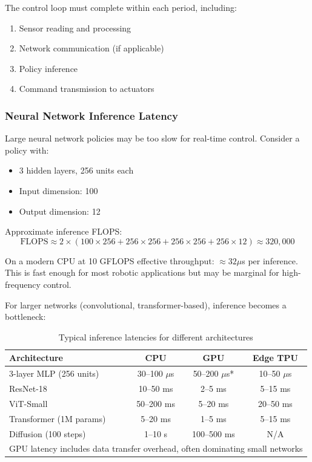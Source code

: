 The control loop must complete within each period, including:
\begin{enumerate}
    \item Sensor reading and processing
    \item Network communication (if applicable)
    \item Policy inference
    \item Command transmission to actuators
\end{enumerate}

\subsubsection{Neural Network Inference Latency}

Large neural network policies may be too slow for real-time control. Consider a policy with:
\begin{itemize}
    \item 3 hidden layers, 256 units each
    \item Input dimension: 100
    \item Output dimension: 12
\end{itemize}

Approximate inference FLOPS:
\begin{equation}
\text{FLOPS} \approx 2 \times (100 \times 256 + 256 \times 256 + 256 \times 256 + 256 \times 12) \approx 320,000
\end{equation}

On a modern CPU at 10 GFLOPS effective throughput: $\approx 32 \mu$s per inference. This is fast enough for most robotic applications but may be marginal for high-frequency control.

For larger networks (convolutional, transformer-based), inference becomes a bottleneck:

\begin{table}[htbp]
\centering
\caption{Typical inference latencies for different architectures}
\label{tab:inference_latency}
\begin{tabular}{lccc}
\toprule
\textbf{Architecture} & \textbf{CPU} & \textbf{GPU} & \textbf{Edge TPU} \\
\midrule
3-layer MLP (256 units) & 30--100 $\mu$s & 50--200 $\mu$s* & 10--50 $\mu$s \\
ResNet-18 & 10--50 ms & 2--5 ms & 5--15 ms \\
ViT-Small & 50--200 ms & 5--20 ms & 20--50 ms \\
Transformer (1M params) & 5--20 ms & 1--5 ms & 5--15 ms \\
Diffusion (100 steps) & 1--10 s & 100--500 ms & N/A \\
\bottomrule
\multicolumn{4}{l}{\small *GPU latency includes data transfer overhead, often dominating small networks}
\end{tabular}
\end{table}

